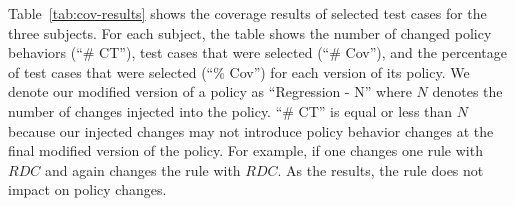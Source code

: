 

%



Table~\ref{tab:cov-results} shows the coverage results of selected test cases for the three subjects.
For each subject, the table shows the number of
changed policy behaviors (``\# CT''), test
cases that were selected (``\# Cov''), and the percentage of test
cases that were selected (``\% Cov'') for each version of its policy.
We denote our modified version of a policy as ``Regression - N'' where
$N$ denotes the number of changes injected into the policy.
``\# CT'' is equal or less than $N$ because our injected changes may not introduce
policy behavior changes at the final modified version of the policy. For example, if one changes
one rule with $RDC$ and again changes the rule with $RDC$. As the results, the rule does not impact
on policy changes.



